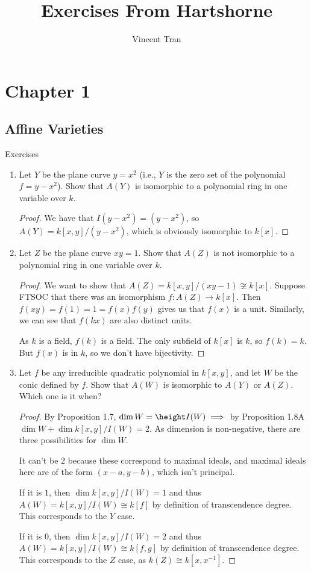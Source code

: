 \documentclass[openany, amssymb, psamsfonts]{amsart}
\title{Exercises From Hartshorne}
\author{Vincent Tran}
\begin{document}
\maketitle

\tableofcontents

\section{Chapter 1}

\subsection{Affine Varieties}

Exercises

\begin{exercise}[1.1]
\begin{enumerate}
\item Let $Y $ be the plane curve $y = x^2 $ (i.e., $Y $ is the zero set of the polynomial $f = y - x^2 $). Show that $A(Y) $ is isomorphic to a polynomial ring in one variable over $k $.
\begin{proof}
	We have that $I(y-x^2) = (y-x^2) $, so $A(Y) = k[x,y] / (y-x^2) $, which is obviously isomorphic to $k[x] $.
\end{proof}
\item Let $Z $ be the plane curve $xy = 1 $. Show that $A(Z) $ is not isomorphic to a polynomial ring in one variable over $k $.
\begin{proof}
	We want to show that $A(Z) = k[x,y] / (xy-1) \not\cong k[x] $.
	Suppose FTSOC that there was an isomorphism $f: A(Z) \to k[x]$.
	Then $f(xy) = f(1) = 1 = f(x)f(y) $ gives us that $f(x) $ is a unit.
	Similarly, we can see that $f(kx) $ are also distinct units.

	As $k $ is a field, $f(k) $ is a field.
	The only subfield of $k[x] $ is $k $, so $f(k) = k $.
	But $f(x) $ is in $k $, so we don't have bijectivity.
\end{proof}
\item Let $f $ be any irreducible quadratic polynomial in $k[x,y] $, and let $W $ be the conic defined by $f $. Show that $A(W) $ is isomorphic to $A(Y) $ or $A(Z) $. Which one is it when?
\begin{proof}
	By Proposition 1.7, $\dim W = \height I(W) \implies $ by Proposition 1.8A $\dim W + \dim k[x,y] / I(W) = 2 $.
	As dimension is non-negative, there are three possibilities for $\dim W $.

	It can't be $2 $ because these correspond to maximal ideals, and maximal ideals here are of the form $(x-a,y-b) $, which isn't principal.

	If it is $1 $, then $\dim k[x,y] / I(W) = 1 $ and thus $A(W) = k[x,y] / I(W) \cong k[f] $ by definition of transcendence degree.
	This corresponds to the $Y $ case.

	If it is $0 $, then $\dim k[x,y] / I(W) = 2 $ and thus $A(W) = k[x,y] / I(W) \cong k[f,g] $ by definition of transcendence degree.
	This corresponds to the $Z $ case, as $k(Z) \cong k[x,x^{-1}] $.
\end{proof}
\end{enumerate}
\end{exercise}
\end{document}
